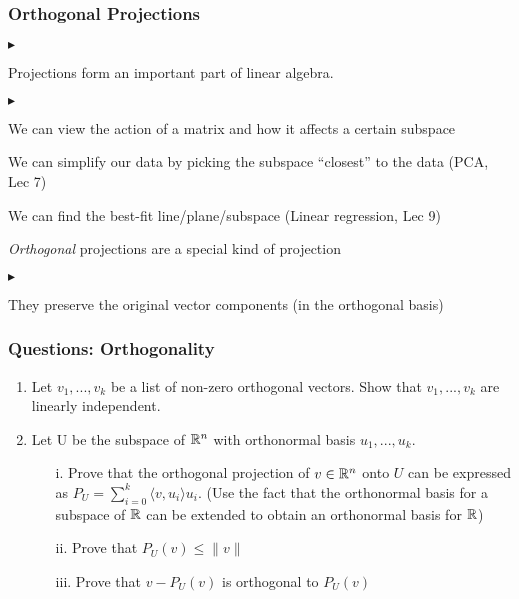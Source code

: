 \documentclass{beamer}
\renewenvironment{itemize}
\renewenvironment{enumerate}%
{\begin{list}{\arabic{enumi}.}%
      {\setlength{\leftmargin}{2.5em}%
       \setlength{\itemsep}{-\parsep}%
       \setlength{\topsep}{-\parskip}%
       \usecounter{enumi}}%
 }{\end{list}}
\renewenvironment{itemize}%
{\begin{list}{$\blacktriangleright$}%
      {\setlength{\leftmargin}{2.5em}%
       \setlength{\itemsep}{-\parsep}%
       \setlength{\topsep}{-\parskip}%
       \usecounter{enumi}}%
 }{\end{list}}
\begin{document}
\begin{frame}
\frametitle{Orthogonal Projections}
\begin{itemize}
\item Projections form an important part of linear algebra.
\begin{itemize}
\item We can view the action of a matrix and how it affects a certain subspace
\item We can simplify our data by picking the subspace ``closest'' to the data (PCA, Lec 7)
\item We can find the best-fit line/plane/subspace  (Linear regression, Lec 9)
\end{itemize}
\medskip
\item \textit{Orthogonal} projections are a special kind of projection
\begin{itemize}
\item They preserve the original vector components (in the orthogonal basis)

\end{itemize}
\end{itemize}

\end{frame}



\begin{frame}

\frametitle{Questions: Orthogonality}
\begin{enumerate}
\item Let $v_1,...,v_k$ be a list of non-zero orthogonal vectors. Show that $v_1,...,v_k$ are linearly independent.
\item Let U be the subspace of $\mathbb{R}^n$ with orthonormal basis $u_1,...,u_k$.
\begin{enumerate}
 \item[i.] Prove that the orthogonal projection of $v \in \mathbb{R}^n$ onto $U$ can be expressed as $P_U  = \sum_{i=0}^k  \langle v,u_i \rangle u_i$. (Use the fact that the orthonormal basis for a subspace of $\mathbb{R}$ can be extended to obtain an orthonormal basis for $\mathbb{R}$)
 \item[ii.] Prove that $P_U(v)\leq \|v\|$
 \item[iii.] Prove that $v-P_U(v)$ is orthogonal to $P_U(v)$
\end{enumerate}
\end{enumerate}
\end{frame}
\end{document}
